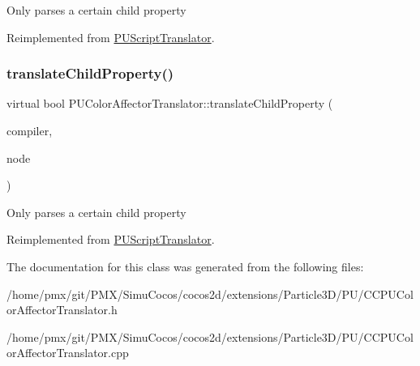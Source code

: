 Only parses a certain child property 

Reimplemented from \hyperlink{classPUScriptTranslator_a0374d83a8a04e57918975d525e0f8fe8}{P\+U\+Script\+Translator}.

\mbox{\label{classPUColorAffectorTranslator_a0f505147815619f2b7be9065b4a959db}} 
\subsubsection{\texorpdfstring{translate\+Child\+Property()}{translateChildProperty()}\hspace{0.1cm}{\footnotesize\ttfamily [2/2]}}
{\footnotesize\ttfamily virtual bool P\+U\+Color\+Affector\+Translator\+::translate\+Child\+Property (\begin{DoxyParamCaption}\item[{\hyperlink{classPUScriptCompiler}{P\+U\+Script\+Compiler} $\ast$}]{compiler,  }\item[{\hyperlink{classPUAbstractNode}{P\+U\+Abstract\+Node} $\ast$}]{node }\end{DoxyParamCaption})\hspace{0.3cm}{\ttfamily [virtual]}}

Only parses a certain child property 

Reimplemented from \hyperlink{classPUScriptTranslator_a0374d83a8a04e57918975d525e0f8fe8}{P\+U\+Script\+Translator}.



The documentation for this class was generated from the following files\+:\begin{DoxyCompactItemize}
\item 
/home/pmx/git/\+P\+M\+X/\+Simu\+Cocos/cocos2d/extensions/\+Particle3\+D/\+P\+U/C\+C\+P\+U\+Color\+Affector\+Translator.\+h\item 
/home/pmx/git/\+P\+M\+X/\+Simu\+Cocos/cocos2d/extensions/\+Particle3\+D/\+P\+U/C\+C\+P\+U\+Color\+Affector\+Translator.\+cpp\end{DoxyCompactItemize}
